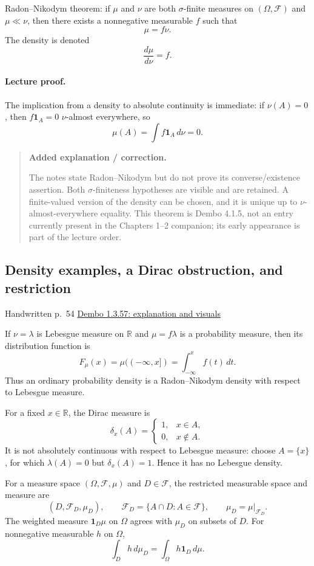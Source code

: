 \documentclass[11pt,letterpaper]{article}
\newcommand{\lecturesection}[1]{\subsection{#1}}
\begin{document}
Radon--Nikodym theorem: if $\mu$ and $\nu$ are both $\sigma$-finite measures on $(\Omega,\mathcal F)$ and $\mu\ll\nu$, then there exists a nonnegative measurable $f$ such that \[\mu=f\nu.\] The density is denoted \[\frac{d\mu}{d\nu}=f.\]

\paragraph{Lecture proof.}
The implication from a density to absolute continuity is immediate: if $\nu(A)=0$, then $f\mathbf1_A=0$ $\nu$-almost everywhere, so \[\mu(A)=\int f\mathbf1_A\,d\nu=0.\]

\begin{quote}\small\textbf{Added explanation / correction.}

The notes state Radon--Nikodym but do not prove its converse/existence assertion. Both $\sigma$-finiteness hypotheses are visible and are retained. A finite-valued version of the density can be chosen, and it is unique up to $\nu$-almost-everywhere equality. This theorem is Dembo 4.1.5, not an entry currently present in the Chapters 1--2 companion; its early appearance is part of the lecture order.
\end{quote}

\hypertarget{l6-s9}{}
\lecturesection{Density examples, a Dirac obstruction, and restriction}
{\small\textcolor{lectureink}{Handwritten p.\ 54} \quad \href{https://josephrbailey.com/probability/\#entry-1-3-57}{Dembo 1.3.57: explanation and visuals}}

If $\nu=\lambda$ is Lebesgue measure on $\mathbb R$ and $\mu=f\lambda$ is a probability measure, then its distribution function is \[F_\mu(x)=\mu(( -\infty,x])=\int_{-\infty}^{x}f(t)\,dt.\] Thus an ordinary probability density is a Radon--Nikodym density with respect to Lebesgue measure.

For a fixed $x\in\mathbb R$, the Dirac measure is \[\delta_x(A)=\begin{cases}1,&x\in A,\\0,&x\notin A.\end{cases}\] It is not absolutely continuous with respect to Lebesgue measure: choose $A=\{x\}$, for which $\lambda(A)=0$ but $\delta_x(A)=1$. Hence it has no Lebesgue density.

For a measure space $(\Omega,\mathcal F,\mu)$ and $D\in\mathcal F$, the restricted measurable space and measure are \[(D,\mathcal F_D,\mu_D),\qquad \mathcal F_D=\{A\cap D:A\in\mathcal F\},\qquad \mu_D=\mu|_{\mathcal F_D}.\] The weighted measure $\mathbf1_D\mu$ on $\Omega$ agrees with $\mu_D$ on subsets of $D$. For nonnegative measurable $h$ on $\Omega$, \[\int_D h\,d\mu_D=\int_\Omega h\mathbf1_D\,d\mu.\]
\end{document}
